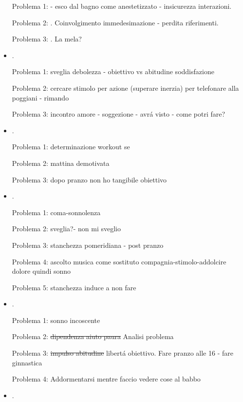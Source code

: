 \begin{itemize}
Problema 1:  - esco dal bagno come anestetizzato - insicurezza interazioni.

Problema 2: . Coinvolgimento immedesimazione - perdita riferimenti.

Problema 3: . La mela? 


\item {}.

Problema 1: sveglia debolezza - obiettivo vs abitudine soddisfazione

Problema 2: cercare stimolo per azione (superare inerzia) per telefonare alla poggiani - rimando

Problema 3: incontro amore - soggezione - avr\'a visto - come potri fare?

\item {}.

Problema 1: determinazione workout se

Problema 2: mattina demotivata

Problema 3: dopo pranzo non ho tangibile obiettivo

\item {}.

Problema 1: coma-sonnolenza

Problema 2: sveglia?- non mi sveglio

Problema 3: stanchezza pomeridiana - post pranzo

Problema 4: ascolto musica come sostituto compagnia-stimolo-addolcire dolore quindi sonno

Problema 5: stanchezza induce a non fare

\item {}.

Problema 1: sonno incoscente

Problema 2: \sout{dipendenza aiuto paura} Analisi problema

Problema 3: \sout{impulso abitudine} libert\'a obiettivo. Fare pranzo alle 16 - fare ginnastica

Problema 4: Addormentarsi mentre faccio vedere cose al babbo

\item {}.


\end{itemize}

